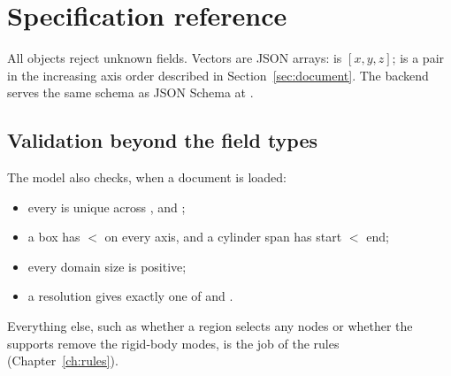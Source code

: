 \chapter{Specification reference}\label{app:spec}

All objects reject unknown fields. Vectors are JSON arrays:  is $[x, y, z]$;
 is a pair in the increasing axis order described in Section~\ref{sec:document}. The backend
serves the same schema as JSON Schema at .





\section{Validation beyond the field types}
The model also checks, when a document is loaded:
\begin{itemize}
  \item every  is unique across ,  and ;
  \item a box has  $<$  on every axis, and a cylinder span has start $<$ end;
  \item every domain size is positive;
  \item a resolution gives exactly one of  and .
\end{itemize}
Everything else, such as whether a region selects any nodes or whether the supports remove the rigid-body modes, is the
job of the rules (Chapter~\ref{ch:rules}).

